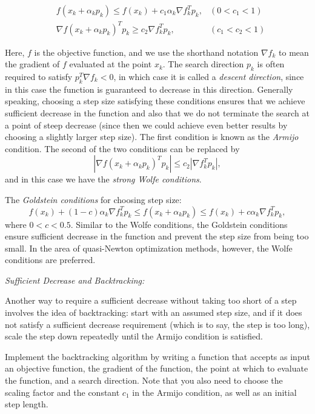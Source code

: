 \begin{align*}
&f(x_k + \alpha_kp_k) \leq f(x_k) + c_1\alpha_k\nabla f_k^Tp_k, &(0 < c_1 < 1)
\\ &\nabla f(x_k + \alpha_kp_k)^Tp_k \geq c_2\nabla f_k^Tp_k, &(c_1 < c_2 < 1)
\end{align*}

Here, $f$ is the objective function, and we use the shorthand notation $\nabla f_k$ to mean the gradient of $f$ evaluated at the point $x_k$. The search direction $p_k$ is often required to satisfy $p_k^T \nabla f_k < 0$, in which case it is called a \emph{descent direction}, since in this case the function is guaranteed to decrease in this direction. Generally speaking, choosing a step size satisfying these conditions ensures that we achieve sufficient decrease in the function and also that we do not terminate the search at a point of steep decrease (since then we could achieve even better results by choosing a slightly larger step size). The first condition is known as the \emph{Armijo} condition. The second of the two conditions can be replaced by $$ | \nabla f(x_k + \alpha_kp_k)^Tp_k| \leq c_2 | \nabla f_k^Tp_k|,$$ and in this case we have the \emph{strong Wolfe conditions}.

The \emph{Goldstein conditions} for choosing step size:
$$
f(x_k) + (1-c)\alpha_k\nabla f_k^Tp_k \leq f(x_k + \alpha_kp_k) \leq f(x_k) + c\alpha_k\nabla f_k^Tp_k,
$$
where $0 < c < 0.5$. Similar to the Wolfe conditions, the Goldstein conditions ensure sufficient decrease in the function and prevent the step size from being too small. In the area of quasi-Newton optimization methods, however, the Wolfe conditions are preferred.

\emph{Sufficient Decrease and Backtracking:}

Another way to require a sufficient decrease without taking too short of a step involves the idea of backtracking: start with an assumed step size, and if it does not satisfy a sufficient decrease requirement (which is to say, the step is too long), scale the step down repeatedly until the Armijo condition is satisfied.

\begin{problem}
Implement the backtracking algorithm by writing a function that accepts as input an objective function, the gradient of the function, the point at which to evaluate the function, and a search direction. Note that you also need to choose the scaling factor and the constant $c_1$ in the Armijo condition, as well as an initial step length.
\end{problem}



